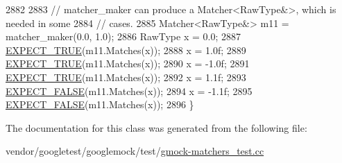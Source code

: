 \begin{DoxyCode}
2882 
2883     \textcolor{comment}{// matcher\_maker can produce a Matcher<RawType&>, which is needed in some}
2884     \textcolor{comment}{// cases.}
2885     Matcher<RawType&> m11 = matcher\_maker(0.0, 1.0);
2886     RawType x = 0.0;
2887     \hyperlink{gtest_8h_ac33e7cdfb5d44a7a0f0ab552eb5c3c6a}{EXPECT\_TRUE}(m11.Matches(x));
2888     x = 1.0f;
2889     \hyperlink{gtest_8h_ac33e7cdfb5d44a7a0f0ab552eb5c3c6a}{EXPECT\_TRUE}(m11.Matches(x));
2890     x = -1.0f;
2891     \hyperlink{gtest_8h_ac33e7cdfb5d44a7a0f0ab552eb5c3c6a}{EXPECT\_TRUE}(m11.Matches(x));
2892     x = 1.1f;
2893     \hyperlink{gtest_8h_aeb6c7ae89f440c90c1a1815951c836da}{EXPECT\_FALSE}(m11.Matches(x));
2894     x = -1.1f;
2895     \hyperlink{gtest_8h_aeb6c7ae89f440c90c1a1815951c836da}{EXPECT\_FALSE}(m11.Matches(x));
2896   \}
\end{DoxyCode}


The documentation for this class was generated from the following file\+:\begin{DoxyCompactItemize}
\item 
vendor/googletest/googlemock/test/\hyperlink{gmock-matchers__test_8cc}{gmock-\/matchers\+\_\+test.\+cc}\end{DoxyCompactItemize}
